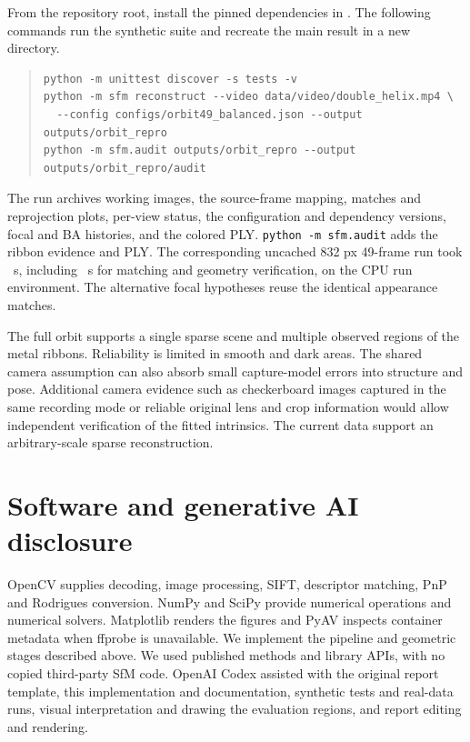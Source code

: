 \documentclass[11pt,a4paper]{article}
\begin{document}
From the repository root, install the pinned dependencies in
. The following commands run the synthetic suite
and recreate the main result in a new directory.
\begin{quote}
\small
\begin{verbatim}
python -m unittest discover -s tests -v
python -m sfm reconstruct --video data/video/double_helix.mp4 \
  --config configs/orbit49_balanced.json --output outputs/orbit_repro
python -m sfm.audit outputs/orbit_repro --output outputs/orbit_repro/audit
\end{verbatim}
\end{quote}
The run archives working images, the source-frame mapping,
matches and reprojection plots, per-view status, the configuration and
dependency versions, focal and BA histories, and the colored PLY.
\texttt{python -m sfm.audit} adds the ribbon evidence and PLY.
The corresponding uncached 832 px 49-frame run took \FullTime\ s,
including \MatchTime\ s for matching and geometry verification, on the
CPU run environment. The alternative focal hypotheses reuse the
identical appearance matches.

The full orbit supports a single sparse scene and multiple observed
regions of the metal ribbons. Reliability is limited in smooth and
dark areas. The shared camera assumption can also absorb small
capture-model errors into structure and pose. Additional camera evidence
such as checkerboard images captured in the same recording mode or
reliable original lens and crop information would allow independent
verification of the fitted intrinsics. The current data support an
arbitrary-scale sparse reconstruction.

\section{Software and generative AI disclosure}

OpenCV supplies decoding, image processing, SIFT, descriptor matching,
PnP and Rodrigues conversion. NumPy and SciPy provide numerical
operations and numerical solvers. Matplotlib renders the figures and
PyAV inspects container metadata when ffprobe is unavailable. We implement
the pipeline and geometric stages described above. We used published
methods and library APIs, with no copied third-party SfM code.
OpenAI Codex assisted with the original report template, this
implementation and documentation, synthetic tests and real-data runs,
visual interpretation and drawing the evaluation regions, and report
editing and rendering.



\end{document}

